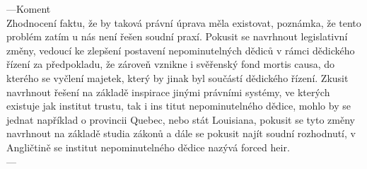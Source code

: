 \documentclass{article}
\begin{document}






---Koment\\
Zhodnocení faktu, že by taková právní úprava měla existovat, poznámka, že tento problém zatím u nás není řešen soudní praxí. Pokusit se navrhnout legislativní změny, vedoucí ke zlepšení postavení nepominutelných dědiců v rámci dědického řízení za předpokladu, že zároveň vznikne i svěřenský fond mortis causa, do kterého se vyčlení majetek, který by jinak byl součástí dědického řízení. Zkusit navrhnout řešení na základě inspirace jinými právními systémy, ve kterých existuje jak institut trustu, tak i ins  titut nepominutelného dědice, mohlo by se jednat například o provincii Quebec, nebo stát Louisiana, pokusit se tyto změny navrhnout na základě studia zákonů a dále se pokusit najít soudní rozhodnutí, v Angličtině se institut nepominutelného dědice nazývá forced heir. \\
---\\
\end{document}
